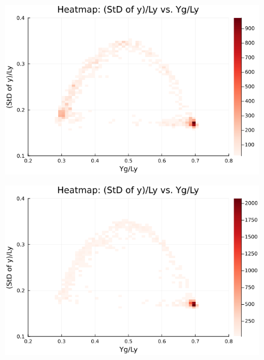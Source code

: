 \begin{figure}[H]
  \centering
  \includegraphics[scale=0.6]{image/RaRtmap_heat/2023-11-15T10:07:20.945__chi1.265_Ay50_rho0.4_T0.43_dT0.04_Rd0.0_Rt0.375_Ra1.4081535_g0.0003999718779659611_run4.0e7_output.png}
  \label{}
\end{figure}

\begin{figure}[H]
  \centering
  \includegraphics[scale=0.6]{image/RaRtmap_heat/2023-11-15T10:59:30.665__chi1.265_Ay50_rho0.4_T0.43_dT0.04_Rd0.0_Rt0.375_Ra1.877538_g0.0003999718779659611_run4.0e7_output.png}
  \label{}
\end{figure}

